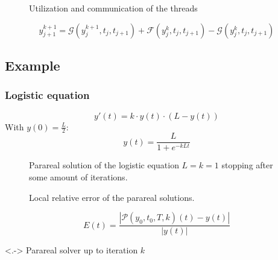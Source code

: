 
\begin{frame}
\begin{figure}[ht]
    \centering
    \caption{Utilization and communication of the threads}
    \label{fig:sequence}
\end{figure}
\begin{equation*}
y_{j+1}^{k+1} = \mathcal{G}\!\!\left(y_j^{k+1}, t_j, t_{j+1}\right) + \mathcal{F}\!\!\left(y_j^k, t_j, t_{j+1}\right) - \mathcal{G}\!\!\left(y_j^k, t_j, t_{j+1}\right)
\end{equation*}
\end{frame}

\subsection{Example}

\begin{frame}
\frametitle{Logistic equation}
\begin{equation*}
    y'(t) = k \cdot y(t) \cdot (L - y(t))
\end{equation*}
With \(y(0)= \frac{L}{2}\):
\begin{equation*}
    y(t) = \frac{L}{1+e^{-k L t}}
\end{equation*}
\end{frame}

\begin{frame}
    \begin{figure}[ht]
        \centering
        \scalebox{0.8}{}
        \caption{Parareal solution of the logistic equation \(L = k = 1\) stopping after some amount of iterations.}
        \label{fig:iters_log}
    \end{figure}
\end{frame}

\begin{frame}
    \begin{figure}[ht]
        \centering
        \scalebox{0.8}{}
        \caption{Local relative error of the parareal solutions.}
        \label{fig:iters_log}
    \end{figure}
    \begin{equation*}
        E(t) = \frac{\left|\mathcal{P}(y_0,t_0,T,k)(t)-y(t)\right|}{\left|y(t)\right|}
    \end{equation*}
    \begin{description}[]
        \item[\(\mathcal{P}\!\left(y, t_{A}, t_{\Omega}, k\right)\)]<.-> Parareal solver up to iteration \(k\)
    \end{description}
\end{frame}

